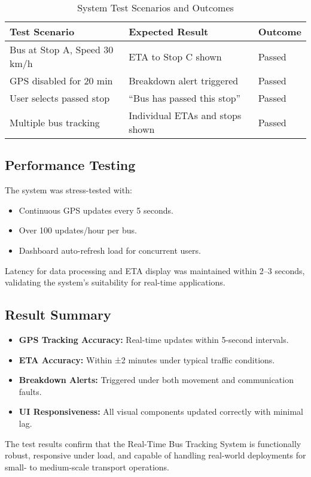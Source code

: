 \documentclass{article}
\begin{document}
\begin{multicols}{2}
\begin{table}[H]
\centering
\caption{System Test Scenarios and Outcomes}
\label{tab:results}
\begin{tabular}{|p{2.5cm}|p{3cm}|p{1.5cm}|}
\hline
\textbf{Test Scenario} & \textbf{Expected Result} & \textbf{Outcome} \\
\hline
Bus at Stop A, Speed 30 km/h & ETA to Stop C shown & Passed \\
\hline
GPS disabled for 20 min & Breakdown alert triggered & Passed \\
\hline
User selects passed stop & “Bus has passed this stop” & Passed \\
\hline
Multiple bus tracking & Individual ETAs and stops shown & Passed \\
\hline
\end{tabular}
\end{table}

\subsection{Performance Testing}
The system was stress-tested with:
\begin{itemize}
  \item Continuous GPS updates every 5 seconds.
  \item Over 100 updates/hour per bus.
  \item Dashboard auto-refresh load for concurrent users.
\end{itemize}
Latency for data processing and ETA display was maintained within 2–3 seconds, validating the system's suitability for real-time applications.

\subsection{Result Summary}
\begin{itemize}
  \item \textbf{GPS Tracking Accuracy:} Real-time updates within 5-second intervals.
  \item \textbf{ETA Accuracy:} Within ±2 minutes under typical traffic conditions.
  \item \textbf{Breakdown Alerts:} Triggered under both movement and communication faults.
  \item \textbf{UI Responsiveness:} All visual components updated correctly with minimal lag.
\end{itemize}

The test results confirm that the Real-Time Bus Tracking System is functionally robust, responsive under load, and capable of handling real-world deployments for small- to medium-scale transport operations.



\end{multicols}
\end{document}
